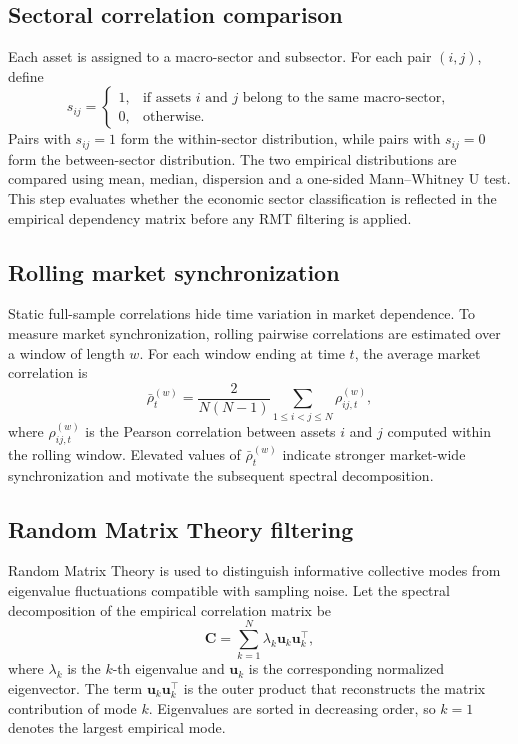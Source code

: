 \subsection{Sectoral correlation comparison}
\label{subsec:sectoral_method}

Each asset is assigned to a macro-sector and subsector. For each pair $(i,j)$, define
\begin{equation}
s_{ij}
=
\begin{cases}
1, & \text{if assets } i \text{ and } j \text{ belong to the same macro-sector},\\
0, & \text{otherwise.}
\end{cases}
\end{equation}
Pairs with $s_{ij}=1$ form the within-sector distribution, while pairs with $s_{ij}=0$ form the between-sector distribution. The two empirical distributions are compared using mean, median, dispersion and a one-sided Mann--Whitney U test. This step evaluates whether the economic sector classification is reflected in the empirical dependency matrix before any RMT filtering is applied.

\subsection{Rolling market synchronization}
\label{subsec:rolling_corr_method}

Static full-sample correlations hide time variation in market dependence. To measure market synchronization, rolling pairwise correlations are estimated over a window of length $w$. For each window ending at time $t$, the average market correlation is
\begin{equation}
\bar{\rho}_t^{(w)}
=
\frac{2}{N(N-1)}
\sum_{1\leq i<j\leq N}
\rho_{ij,t}^{(w)},
\end{equation}
where $\rho_{ij,t}^{(w)}$ is the Pearson correlation between assets $i$ and $j$ computed within the rolling window. Elevated values of $\bar{\rho}_t^{(w)}$ indicate stronger market-wide synchronization and motivate the subsequent spectral decomposition.

\subsection{Random Matrix Theory filtering}
\label{subsec:rmt_method}

Random Matrix Theory is used to distinguish informative collective modes from eigenvalue fluctuations compatible with sampling noise. Let the spectral decomposition of the empirical correlation matrix be
\begin{equation}
\mathbf{C}
=
\sum_{k=1}^{N}
\lambda_k
\mathbf{u}_k
\mathbf{u}_k^{\top},
\end{equation}
where $\lambda_k$ is the $k$-th eigenvalue and $\mathbf{u}_k$ is the corresponding normalized eigenvector. The term $\mathbf{u}_k\mathbf{u}_k^{\top}$ is the outer product that reconstructs the matrix contribution of mode $k$. Eigenvalues are sorted in decreasing order, so $k=1$ denotes the largest empirical mode.

